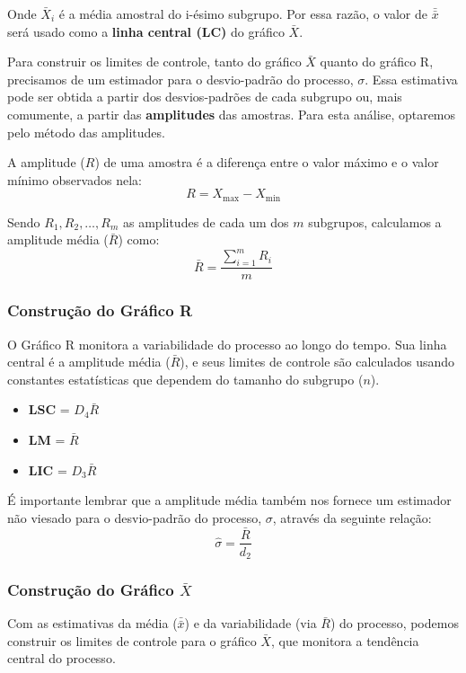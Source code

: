 \documentclass[
  portuguese,
  11pt,
  a4paper,
  DIV=11,
  numbers=noendperiod]{scrreprt}
\providecommand{\tightlist}{%
  \setlength{\itemsep}{0pt}\setlength{\parskip}{0pt}}
\begin{document}
Onde \(\bar{X}_i\) é a média amostral do i-ésimo subgrupo. Por essa
razão, o valor de \(\bar{\bar{x}}\) será usado como a \textbf{linha
central (LC)} do gráfico \(\bar{X}\).

Para construir os limites de controle, tanto do gráfico \(\bar{X}\)
quanto do gráfico R, precisamos de um estimador para o desvio-padrão do
processo, \(\sigma\). Essa estimativa pode ser obtida a partir dos
desvios-padrões de cada subgrupo ou, mais comumente, a partir das
\textbf{amplitudes} das amostras. Para esta análise, optaremos pelo
método das amplitudes.

A amplitude (\(R\)) de uma amostra é a diferença entre o valor máximo e
o valor mínimo observados nela: \[R = X_{\text{max}} - X_{\text{min}}\]

Sendo \(R_1, R_2, \ldots, R_m\) as amplitudes de cada um dos
\textbf{\(m\)} subgrupos, calculamos a amplitude média (\(\bar{R}\))
como: \[\bar{R} = \frac{\sum_{i=1}^{m} R_i}{m}\]

\subsubsection{Construção do Gráfico
R}\label{construuxe7uxe3o-do-gruxe1fico-r}

O Gráfico R monitora a variabilidade do processo ao longo do tempo. Sua
linha central é a amplitude média (\(\bar{R}\)), e seus limites de
controle são calculados usando constantes estatísticas que dependem do
tamanho do subgrupo (\(n\)).

\begin{itemize}
\tightlist
\item
  \textbf{LSC} = \(D_4 \bar{R}\)
\item
  \textbf{LM} = \(\bar{R}\)
\item
  \textbf{LIC} = \(D_3 \bar{R}\)
\end{itemize}

É importante lembrar que a amplitude média também nos fornece um
estimador não viesado para o desvio-padrão do processo, \(\sigma\),
através da seguinte relação: \[\hat{\sigma} = \frac{\bar{R}}{d_2}\]

\subsubsection{\texorpdfstring{Construção do Gráfico
\(\bar{X}\)}{Construção do Gráfico \textbackslash bar\{X\}}}\label{construuxe7uxe3o-do-gruxe1fico-barx}

Com as estimativas da média (\(\bar{\bar{x}}\)) e da variabilidade (via
\(\bar{R}\)) do processo, podemos construir os limites de controle para
o gráfico \(\bar{X}\), que monitora a tendência central do processo.
\end{document}

